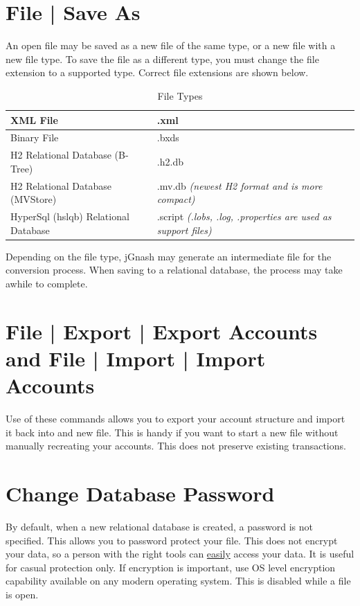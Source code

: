 \documentclass[letterpaper,12pt]{book}
\begin{document}
    \section{File | Save As}
    An open file may be saved as a new file of the same type, or a new file with a new file type.
    To save the file as a different type, you must change the file extension to a supported type.
    Correct file extensions are shown below.

    \begin{table}[H]
        \begin{tabular}{|l|l|}
            \hline
            XML File & .xml \\
            \hline
            Binary File & .bxds \\
            \hline
            H2 Relational Database (B-Tree) & .h2.db \\
            \hline
            H2 Relational Database (MVStore) & .mv.db \textit{(newest H2 format and is more compact)} \\
            \hline
            HyperSql (hslqb) Relational Database & .script \textit{(.lobs, .log, .properties are used as support files)} \\
            \hline
        \end{tabular}
        \caption{File Types}
    \end{table}

    Depending on the file type, jGnash may generate an intermediate file for the conversion process.
    When saving to a relational database, the process may take awhile to complete.

    \section{File | Export | Export Accounts and File | Import | Import Accounts}
    Use of these commands allows you to export your account structure and import it back into and new file.
    This is handy if you want to start a new file without manually recreating your accounts.
    This does not preserve existing transactions.

    \section{Change Database Password}
    By default, when a new relational database is created, a password is not specified. This allows you to password protect
    your file. This does not encrypt your data, so a person with the right tools can \underline{easily} access your data.
    It is useful for casual protection only. If encryption is important, use OS level encryption capability available on
    any modern operating system. This is disabled while a file is open.
\end{document}
